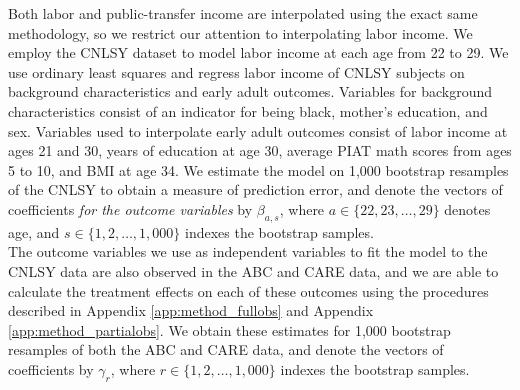 \noindent Both labor and public-transfer income are interpolated using the exact same methodology, so we restrict
our attention to interpolating labor income. We employ the CNLSY dataset to model labor
income at each age from 22 to 29. We use ordinary least squares and regress labor income of
CNLSY subjects on background characteristics and early adult outcomes. Variables for background
characteristics consist of an indicator for being  black, mother's education, and sex. Variables
used to interpolate early adult outcomes consist of labor income at ages 21 and 30, years of education at age 30, average
PIAT math scores from ages 5 to 10, and BMI at age 34. We estimate the model on 1,000 bootstrap
resamples of the CNLSY to obtain a measure of prediction error, and denote the vectors of coefficients
\emph{for the outcome variables} by $\beta_{a,s}$, where $a \in \{22, 23, \dots, 29\}$ denotes age, and
$s \in \{1,2,\dots,1,000\}$ indexes the bootstrap samples. \\




\noindent The outcome variables we use as independent variables to fit the model to the CNLSY data are also
observed in the ABC and CARE data, and we are able to calculate the treatment effects on each of these outcomes
using the procedures described in Appendix \ref{app:method_fullobs} and Appendix \ref{app:method_partialobs}. We
obtain these estimates for 1,000 bootstrap resamples of both the ABC and CARE data, and denote the vectors of
coefficients by $\gamma_r$, where $r \in \{1,2,\dots,1,000\}$ indexes the bootstrap samples. \\

